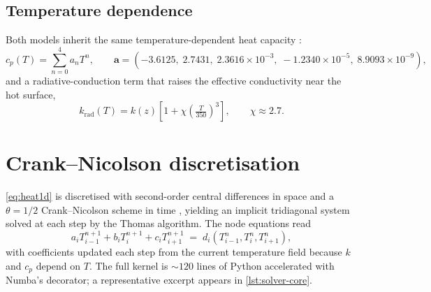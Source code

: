 \subsection{Temperature dependence}

Both models inherit the same temperature-dependent heat capacity
\citep{hayne2017}:
\begin{equation}
  c_p(T) = \sum_{n=0}^{4} a_n T^n,
  \qquad
  \bm{a} = (-3.6125,\; 2.7431,\; 2.3616{\times}10^{-3},\;
             -1.2340{\times}10^{-5},\; 8.9093{\times}10^{-9}),
  \label{eq:cp_T}
\end{equation}
and a radiative-conduction term that raises the effective conductivity
near the hot surface,
\begin{equation}
  k_{\mathrm{rad}}(T) = k(z) \left[1 + \chi\left(\tfrac{T}{350}\right)^3\right],
  \qquad \chi \approx 2.7.
  \label{eq:k_rad}
\end{equation}

\section{Crank--Nicolson discretisation}

\cref{eq:heat1d} is discretised with second-order central differences
in space and a $\theta=1/2$ Crank--Nicolson scheme in time
\citep{crank1947}, yielding an implicit tridiagonal system solved at
each step by the Thomas algorithm.  The node equations read
\begin{equation}
  a_i T_{i-1}^{n+1} + b_i T_i^{n+1} + c_i T_{i+1}^{n+1}
  \;=\;
  d_i\!\left(T_{i-1}^{n}, T_i^{n}, T_{i+1}^{n}\right),
  \label{eq:cn_stencil}
\end{equation}
with coefficients updated each step from the current temperature field
because $k$ and $c_p$ depend on $T$.  The full kernel is ${\sim}120$
lines of Python accelerated with Numba's 
decorator; a representative excerpt appears in
\cref{lst:solver-core}.

